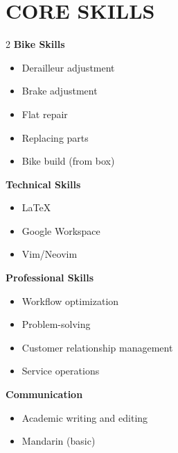 \documentclass[final]{Resume-Format}
\begin{document}
\section{CORE SKILLS}
\begin{mdframed}[linecolor=white!20!orange,linewidth=2pt,topline=false,bottomline=false,rightline=false]
	\vspace{-\multicolsep}
	\begin{multicols}{2}
		\textbf{Bike Skills}
		\begin{itemize}
			\item Derailleur adjustment
			\item Brake adjustment
			\item Flat repair
			\item Replacing parts
			\item Bike build (from box)
		\end{itemize}

		\vspace{6pt}

		\textbf{Technical Skills}
		\begin{itemize}
			\item \LaTeX
			\item Google Workspace
			\item Vim/Neovim
		\end{itemize}

		\vspace{6pt}

		\textbf{Professional Skills}
		\begin{itemize}
			\item Workflow optimization
			\item Problem-solving
			\item Customer relationship management
			\item Service operations
		\end{itemize}

		\vspace{6pt}

		\textbf{Communication}
		\begin{itemize}
			\item Academic writing and editing
			\item Mandarin (basic)
		\end{itemize}
	\end{multicols}
\end{mdframed}
\end{document}
